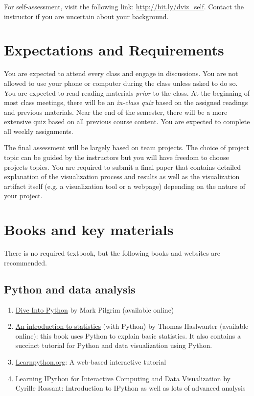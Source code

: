 \documentclass[11pt,article,oneside]{memoir} %
\begin{document}
For self-assessment, visit the following link: \href{http://bit.ly/dviz\_self}{http://bit.ly/dviz\_self}. 
Contact the instructor if you are uncertain about your background. 
\section{Expectations and Requirements}%
\label{sec:requirements}

You are expected to attend every class and engage in discussions. You are not
allowed to use your phone or computer during the class unless asked to do so.
You are expected to read reading materials \emph{prior} to the class. At the
beginning of most class meetings, there will be an \emph{in-class quiz} based
on the assigned readings and previous materials. Near the end of the semester,
there will be a more extensive quiz based on all previous course content. You
are expected to complete all weekly assignments. 

The final assessment will be largely based on team projects. The choice of
project topic can be guided by the instructors but you will have freedom to
choose projects topics. You are required to submit a final paper that contains
detailed explanation of the visualization process and results as well as the
visualization artifact itself (e.g. a visualization tool or a webpage)
depending on the nature of your project. 
\section{Books and key materials}%

There is no required textbook, but the following books and websites are
recommended.

\subsection{Python and data analysis}%

\begin{enumerate}%

\item \href{http://www.diveintopython3.net/index.html}{Dive Into Python} by Mark Pilgrim (available online) 

\item \href{http://work.thaslwanter.at/Stats/html/}{An introduction to statistics} (with Python) by Thomas Haslwanter (available online): this book uses Python to explain basic statistics. It also contains a succinct tutorial for Python and data visualization using Python. 

\item \href{http://www.learnpython.org}{Learnpython.org}: A web-based interactive tutorial 

\item \href{http://ipython.rossant.net}{Learning IPython for Interactive Computing and Data Visualization} by  Cyrille Rossant: Introduction to IPython as well as lots of advanced analysis 


\end{enumerate}%
\end{document}
